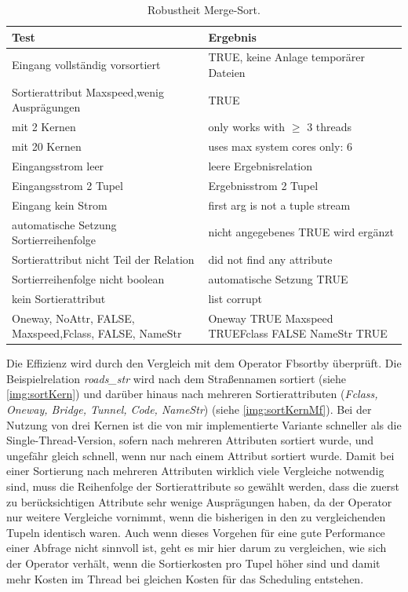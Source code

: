 \documentclass[a4paper,12pt,twoside]{article}
\newcommand{\Fb}[1]{\textit{#1}} %
\begin{document}
\begin{table}
	\centering
	\begin{tabular}{|p{7.5cm}|p{7.5cm}|}
		\hline
		\rowcolor{gray!30}
		Test & Ergebnis \\
		\hline
		Eingang vollständig vorsortiert & TRUE, keine Anlage temporärer Dateien \\
		\hline
		Sortierattribut Maxspeed,\newline wenig Ausprägungen & TRUE  \\
		\hline
		mit 2 Kernen & only works with $\geq$ 3 threads  \\ 
		\hline
		mit 20 Kernen & uses max system cores only: 6 \\ 
		\hline
		Eingangsstrom leer & leere Ergebnisrelation \\ 
		\hline
		Eingangsstrom 2 Tupel & Ergebnisstrom 2 Tupel \\ 
		\hline
		Eingang kein Strom & first arg is not a tuple stream \\ 
		\hline
		automatische Setzung Sortierreihenfolge & nicht angegebenes TRUE wird ergänzt \\ 
		\hline
		Sortierattribut nicht Teil der Relation & did not find any attribute \\ 
		\hline
		Sortierreihenfolge nicht boolean & automatische Setzung TRUE \\ 
		\hline
		kein Sortierattribut & list corrupt \\
		\hline
		Oneway, NoAttr, FALSE, Maxspeed,\newline Fclass, FALSE, NameStr &  Oneway TRUE Maxspeed TRUE\newline Fclass FALSE NameStr TRUE \\
		\hline
\end{tabular}
	\caption{\label{tab:testSortRobust}Robustheit Merge-Sort.}
\end{table}

Die Effizienz wird durch den Vergleich mit dem Operator Fb{sortby} überprüft. Die Beispielrelation \Fb{roads\_str} wird nach dem Straßennamen sortiert (siehe \autoref{img:sortKern}) und darüber hinaus nach mehreren Sortierattributen (\Fb{Fclass, Oneway, Bridge, Tunnel, Code, NameStr}) (siehe \autoref{img:sortKernMf}). Bei der Nutzung von drei Kernen ist die von mir implementierte Variante schneller als die Single-Thread-Version, sofern nach mehreren Attributen sortiert wurde, und ungefähr gleich schnell, wenn nur nach einem Attribut sortiert wurde. Damit bei einer Sortierung nach mehreren Attributen wirklich viele Vergleiche notwendig sind, muss die Reihenfolge der Sortierattribute so gewählt werden, dass die zuerst zu berücksichtigen Attribute sehr wenige Ausprägungen haben, da der Operator nur weitere Vergleiche vornimmt, wenn die bisherigen in den zu vergleichenden Tupeln identisch waren. Auch wenn dieses Vorgehen für eine gute Performance einer Abfrage nicht sinnvoll ist, geht es mir hier darum zu vergleichen, wie sich der Operator verhält, wenn die Sortierkosten pro Tupel höher sind und damit mehr Kosten im Thread bei gleichen Kosten für das Scheduling entstehen.  
\end{document}
